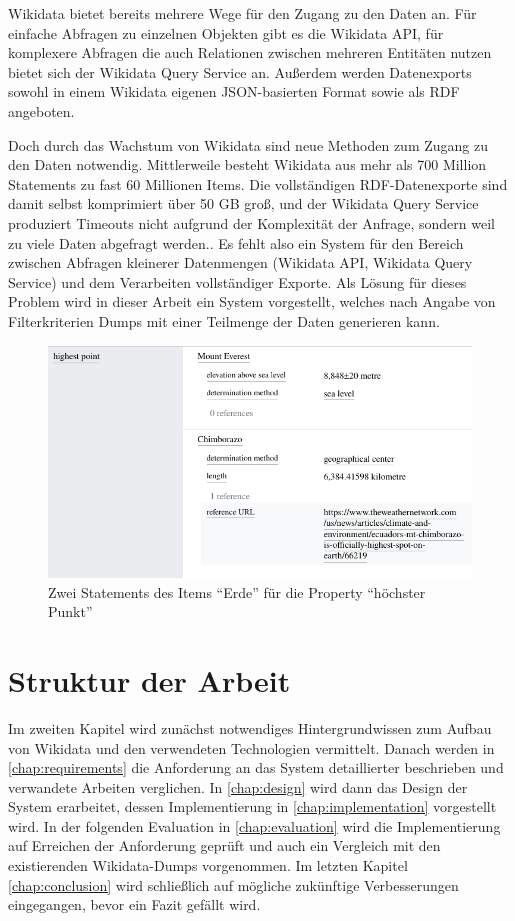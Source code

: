 Wikidata bietet bereits mehrere Wege für den Zugang zu den Daten an.
Für einfache Abfragen zu einzelnen Objekten gibt es die Wikidata API, für komplexere Abfragen die auch Relationen zwischen mehreren Entitäten nutzen bietet sich der Wikidata Query Service an. 
Außerdem werden Datenexports sowohl in einem Wikidata eigenen JSON-basierten Format sowie als RDF angeboten.

Doch durch das Wachstum von Wikidata sind neue Methoden zum Zugang zu den Daten notwendig.
Mittlerweile besteht Wikidata aus mehr als 700 Million Statements zu fast 60 Millionen Items.
Die vollständigen RDF-Datenexporte sind damit selbst komprimiert über 50 GB groß, und der Wikidata Query Service produziert Timeouts nicht aufgrund der Komplexität der Anfrage, sondern weil zu viele Daten abgefragt werden.\cite{wd-wk-common-references}.
Es fehlt also ein System für den Bereich zwischen Abfragen kleinerer Datenmengen (Wikidata API, Wikidata Query Service) und dem Verarbeiten vollständiger Exporte.
Als Lösung für dieses Problem wird in dieser Arbeit ein System vorgestellt, welches nach Angabe von Filterkriterien Dumps mit einer Teilmenge der Daten generieren kann. 

\begin{figure}
  \includegraphics[width=\linewidth]{pics/example-statement}
  \caption{Zwei Statements des Items ``Erde'' für die Property ``höchster Punkt''}
  \label{fig:sample-statement}
\end{figure} 

\section{Struktur der Arbeit}
Im zweiten Kapitel wird zunächst notwendiges Hintergrundwissen zum Aufbau von Wikidata und den verwendeten Technologien vermittelt.
Danach werden in \cref{chap:requirements} die Anforderung an das System detaillierter beschrieben und verwandete Arbeiten verglichen.
In \cref{chap:design} wird dann das Design der System erarbeitet, dessen Implementierung in \cref{chap:implementation} vorgestellt wird.
In der folgenden Evaluation in \cref{chap:evaluation} wird die Implementierung auf Erreichen der Anforderung geprüft und auch ein Vergleich mit den existierenden Wikidata-Dumps vorgenommen.
Im letzten Kapitel \cref{chap:conclusion} wird schließlich auf mögliche zukünftige Verbesserungen eingegangen, bevor ein Fazit gefällt wird.

